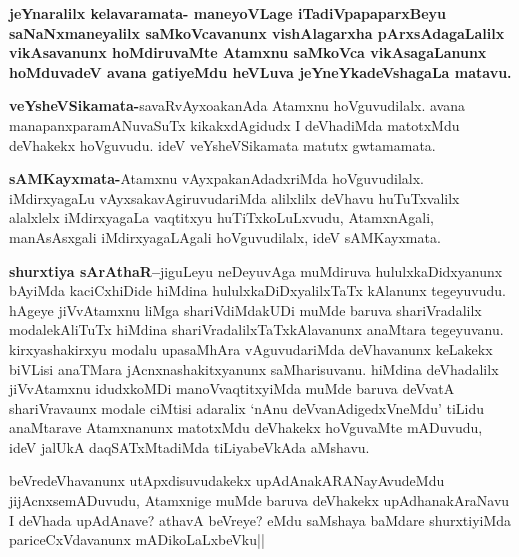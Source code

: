 \begin{artha}
\textbf{jeYnaralilx kelavaramata- maneyoVLage iTadiVpapaparxBeyu saNaNxmaneyalilx saMkoVcavanunx vishAlagarxha pArxsAdagaLalilx vikAsavanunx hoMdiruvaMte Atamxnu saMkoVca vikAsagaLanunx hoMduvadeV avana gatiyeMdu heVLuva jeYneYkadeVshagaLa matavu.}
\end{artha}

\begin{artha}
\textbf{veYsheVSikamata-}savaRvAyxoakanAda Atamxnu hoVguvudilalx. avana manapanxparamANuvaSuTx kikakxdAgidudx I deVhadiMda matotxMdu deVhakekx hoVguvudu. ideV veYsheVSikamata matutx gwtamamata.
\end{artha}

\begin{artha}
\textbf{sAMKayxmata-}Atamxnu vAyxpakanAdadxriMda hoVguvudilalx. iMdirxyagaLu vAyxsakavAgiruvudariMda alilxlilx deVhavu huTuTxvalilx alalxlelx iMdirxyagaLa vaqtitxyu huTiTxkoLuLxvudu, AtamxnAgali, manAsAsxgali iMdirxyagaLAgali hoVguvudilalx, ideV sAMKayxmata.
\end{artha}


\begin{artha}
\textbf{shurxtiya sArAthaR--}jiguLeyu neDeyuvAga muMdiruva hululxkaDidxyanunx bAyiMda kaciCxhiDide hiMdina hululxkaDiDxyalilxTaTx kAlanunx tegeyuvudu. hAgeye jiVvAtamxnu liMga shariVdiMdakUDi muMde baruva shariVradalilx modalekAliTuTx hiMdina shariVradalilxTaTxkAlavanunx anaMtara tegeyuvanu. kirxyashakirxyu modalu upasaMhAra vAguvudariMda deVhavanunx keLakekx biVLisi anaTMara jAcnxnashakitxyanunx saMharisuvanu. hiMdina deVhadalilx jiVvAtamxnu idudxkoMDi manoVvaqtitxyiMda muMde baruva deVvatA shariVravaunx modale ciMtisi adaralix  `nAnu deVvanAdigedxVneMdu' tiLidu anaMtarave Atamxnanunx matotxMdu deVhakekx hoVguvaMte mADuvudu, ideV jalUkA daqSATxMtadiMda tiLiyabeVkAda aMshavu.
\end{artha}

\begin{artha}
beVredeVhavanunx utApxdisuvudakekx upAdAnakARANayAvudeMdu jijAcnxsemADuvudu, Atamxnige muMde baruva deVhakekx upAdhanakAraNavu I deVhada upAdAnave? athavA beVreye? eMdu saMshaya baMdare shurxtiyiMda pariceCxVdavanunx mADikoLaLxbeVku||
\end{artha}

